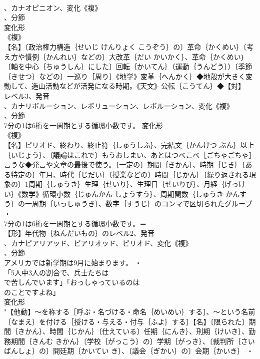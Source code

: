 \documentclass[8pt]{extreport}
\begin{document}
\begin{CJK}{UTF8}{min}
\\	、カナオピニオン、変化《複》
\\	、分節
\\	変化形 
\\	《複》
\\	【名】〔政治権力構造｛せいじ けんりょく こうぞう｝の〕革命｛かくめい｝〔考え方や慣例｛かんれい｝などの〕大改革｛だい かいかく｝、革命｛かくめい｝〔軸を中心｛ちゅうしん｝にした〕回転｛かいてん｝（運動｛うんどう｝）〔季節｛きせつ｝などの〕一巡り［周り］《地学》変革｛へんかく｝◆地殻が大きく変動して、造山活動などが活発になる時期。《天文》公転｛こうてん｝◆【対】
\\	レベル3、発音
\\	、カナリボルーション、レボリューション、レボルーション、変化《複》
\\	、分節
\\	7分の1は6桁を一周期とする循環小数です。	変化形 
\\	《複》
\\	【名】ピリオド、終わり、終止符｛しゅうしふ｝、完結文｛かんけつ ぶん｝以上｛いじょう｝、〔議論はこれで〕もうおしまい、あとはつべこべ［ごちゃごちゃ］言うな◆発言や文章の最後で使う。〔一定の〕期間｛きかん｝、時期｛じき｝〔ある特定の〕年月、時代｛じだい｝〔授業などの〕時間｛じかん｝〔繰り返される現象の〕1周期｛しゅうき｝生理｛せいり｝、生理日｛せいりび｝、月経｛げっけい｝《数学》循環小数｛じゅんかん しょうすう｝、周期関数｛しゅうき かんすう｝の一周期｛いっしゅうき｝、数字｛すうじ｝のコンマで区切られたグループ ・
\\	7分の1は6桁を一周期とする循環小数です。＝ 
\\	【形】年代物｛ねんだいもの｝のレベル2、発音
\\	、カナピアリアッド、ピアリオッド、ピリオド、変化《複》
\\	、分節
\\	アメリカでは新学期は9月に始まります。 ・
\\	「5人中3人の割合で、兵士たちは
\\	で苦しんでいます」「おっしゃっているのは
\\	のことですよね」
\\	変化形 
\\	"【他動】～を称する［呼ぶ・名づける・命名｛めいめい｝する］、～という名前｛なまえ｝を付ける［授ける・与える・付与｛ふよ｝する］【名】〔限られた〕期間｛きかん｝、時間｛じかん｝〔仕えている〕任期｛にんき｝、刑期｛けいき｝、勤務期間｛きんむ きかん｝〔学校｛がっこう｝の〕学期｛がっき｝、〔裁判所｛さいばんしょ｝の〕開廷期｛かいてい き｝、〔議会｛ぎかい｝の〕会期｛かいき｝ ・

\end{CJK}
\end{document}
